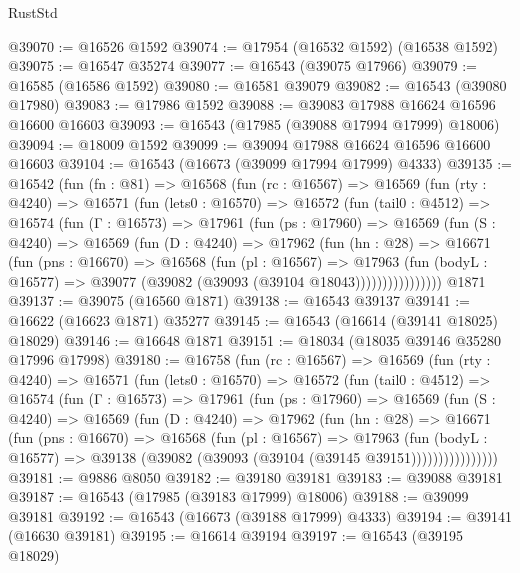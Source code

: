 \begin{lexlean}{RustStd}
\begin{coremodule}
@39070 := @16526 @1592
@39074 := @17954 (@16532 @1592) (@16538 @1592)
@39075 := @16547 @35274
@39077 := @16543 (@39075 @17966)
@39079 := @16585 (@16586 @1592)
@39080 := @16581 @39079
@39082 := @16543 (@39080 @17980)
@39083 := @17986 @1592
@39088 := @39083 @17988 @16624 @16596 @16600 @16603
@39093 := @16543 (@17985 (@39088 @17994 @17999) @18006)
@39094 := @18009 @1592
@39099 := @39094 @17988 @16624 @16596 @16600 @16603
@39104 := @16543 (@16673 (@39099 @17994 @17999) @4333)
@39135 := @16542
    (fun (fn : @81) =>
    @16568
      (fun (rc : @16567) =>
      @16569
        (fun (rty : @4240) =>
        @16571
          (fun (lets0 : @16570) =>
          @16572
            (fun (tail0 : @4512) =>
            @16574
              (fun (Γ : @16573) =>
              @17961
                (fun (ps : @17960) =>
                @16569
                  (fun (S : @4240) =>
                  @16569
                    (fun (D : @4240) =>
                    @17962
                      (fun (hn : @28) =>
                      @16671
                        (fun (pns : @16670) =>
                        @16568
                          (fun (pl : @16567) =>
                          @17963
                            (fun (bodyL : @16577) =>
                            @39077 (@39082 (@39093 (@39104 @18043))))))))))))))))
    @1871
@39137 := @39075 (@16560 @1871)
@39138 := @16543 @39137
@39141 := @16622 (@16623 @1871) @35277
@39145 := @16543 (@16614 (@39141 @18025) @18029)
@39146 := @16648 @1871
@39151 := @18034 (@18035 @39146 @35280 @17996 @17998)
@39180 := @16758
    (fun (rc : @16567) =>
    @16569
      (fun (rty : @4240) =>
      @16571
        (fun (lets0 : @16570) =>
        @16572
          (fun (tail0 : @4512) =>
          @16574
            (fun (Γ : @16573) =>
            @17961
              (fun (ps : @17960) =>
              @16569
                (fun (S : @4240) =>
                @16569
                  (fun (D : @4240) =>
                  @17962
                    (fun (hn : @28) =>
                    @16671
                      (fun (pns : @16670) =>
                      @16568
                        (fun (pl : @16567) =>
                        @17963
                          (fun (bodyL : @16577) =>
                          @39138 (@39082 (@39093 (@39104 (@39145 @39151))))))))))))))))
@39181 := @9886 @8050
@39182 := @39180 @39181
@39183 := @39088 @39181
@39187 := @16543 (@17985 (@39183 @17999) @18006)
@39188 := @39099 @39181
@39192 := @16543 (@16673 (@39188 @17999) @4333)
@39194 := @39141 (@16630 @39181)
@39195 := @16614 @39194
@39197 := @16543 (@39195 @18029)

\end{coremodule}
\end{lexlean}
